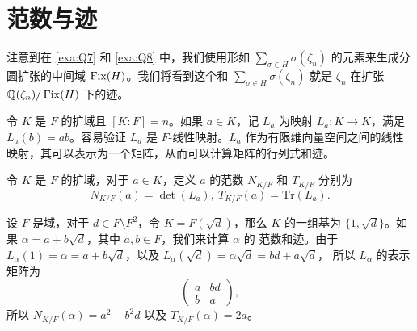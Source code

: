 \section{范数与迹}

注意到在 \autoref{exa:Q7} 和 \autoref{exa:Q8} 中，我们使用形如 $\sum_{\sigma\in H}\sigma(\zeta_n)$
的元素来生成分圆扩张的中间域 $\operatorname{Fix}(H)$。我们将看到这个和 $\sum_{\sigma\in H}\sigma(\zeta_n)$
就是 $\zeta_n$ 在扩张 $\mathbb{Q}(\zeta_n)/\operatorname{Fix}(H)$ 下的迹。

令 $K$ 是 $F$ 的扩域且 $[K:F]=n$。如果 $a\in K$，记 $L_a$ 为映射
$L_a:K\to K$，满足 $L_a(b)=ab$。容易验证 $L_a$ 是 $F$-线性映射。$L_a$
作为有限维向量空间之间的线性映射，其可以表示为一个矩阵，从而可以计算矩阵的行列式和迹。

\begin{definition}
  令 $K$ 是 $F$ 的扩域，对于 $a\in K$，定义 $a$ 的范数 $N_{K/F}$ 和 $T_{K/F}$ 分别为
  \[
    N_{K/F}(a)=\det(L_a),\ T_{K/F}(a)=\mathrm{Tr}(L_a).
  \]
\end{definition}

\begin{example}
  设 $F$ 是域，对于 $d\in F\setminus F^2$，令 $K=F(\sqrt{d})$，那么 $K$ 的一组基为
  $\{1,\sqrt{d}\}$。如果 $\alpha=a+b\sqrt{d}$，其中 $a,b\in F$，我们来计算 $\alpha$ 的
  范数和迹。由于 $L_\alpha(1)=\alpha=a+b\sqrt{d}$，以及 $L_\alpha(\sqrt{d})=\alpha\sqrt{d}=bd+a\sqrt{d}$，
  所以 $L_\alpha$ 的表示矩阵为
  \[
    \begin{pmatrix}
      a & bd \\
      b & a
    \end{pmatrix},
  \]
  所以 $N_{K/F}(\alpha)=a^2-b^2d$ 以及 $T_{K/F}(\alpha)=2a$。
\end{example}







